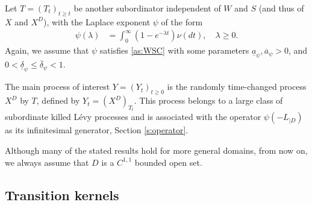 \documentclass[12pt,a4paper,onecolumn]{article}
\theoremstyle{definition}
\newcommand{\1}{\mathbf 1}
\newcommand{\ua}[1]{\underline{a}_{#1}}
\newcommand{\oa}[1]{\overline{a}_{#1}}
\newcommand{\ud}[1]{\underline{\delta}_{#1}}
\newcommand{\od}[1]{\overline{\delta}_{#1}}
\newcommand{\Lo}{\psi(-L_{|D})}
\numberwithin{equation}{section}
\begin{document}
    Let $T=(T_t)_{t\ge t}$ be another subordinator independent of $W$ and $S$ 
    (and thus of $X$ and $X^D$), with the Laplace exponent $\psi$ of the form 
     \begin{align*}
        \psi(\lambda)&=\int_0^\infty (1-e^{-\lambda t})\nu(dt),\quad \lambda\ge 0.
    \end{align*}
   Again, we assume that $\psi$ satisfies \ref{as:WSC} with some parameters $\ua{\psi},\oa{\psi}>0$, and $0<\ud{\psi}\le \od{\psi}<1$.

        The main process of interest $Y=(Y_t)_{t\ge 0}$ is the randomly time-changed process $X^D$ by $T$, defined by $Y_t=(X^D)_{T_t}$. This process belongs to a large class of subordinate killed L\'evy processes and is associated with the operator $\Lo$ as its infinitesimal generator, Section \ref{s:operator}.

    Although many of the stated results hold for more general domains, from now on, we always assume that $D$ is a $C^{1,1}$ bounded open set.
       
    \subsection*{Transition kernels}   
    
\end{document}
